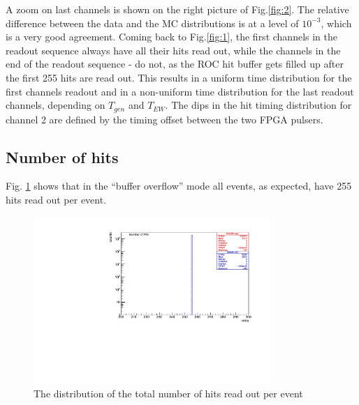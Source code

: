 A zoom on last channels is shown on the right picture of Fig.\ref{fig:2}.
The relative difference between the data and the MC distributions is at a level of $10^{-3}$,
which is a very good agreement.
Coming back to Fig.\ref{fig:1}, the first channels in the readout sequence
always have all their hits read out,
while the channels in the end of the readout sequence - do not,
as the ROC hit buffer gets filled up after
the first 255 hits are read out.
This results in a uniform time distribution for the first channels readout and in a non-uniform
time distribution for the last readout channels, depending on $T_{gen}$ and $T_{EW}$.
The dips in the hit timing distribution for channel 2 are defined by the timing offset
between the two FPGA pulsers. 


\subsection{Number of hits}
Fig. \ref{fig:3} shows that in the ``buffer overflow'' mode all events,
as expected, have 255 hits read out per event.

\begin{figure}[!h]
\centering
\includegraphics[width =0.8\textwidth]{figures/pdf/figure_00008_nhits_281}
\caption{
  The distribution of the total number of hits read out per event
}
\label{fig:3}
\end{figure}


